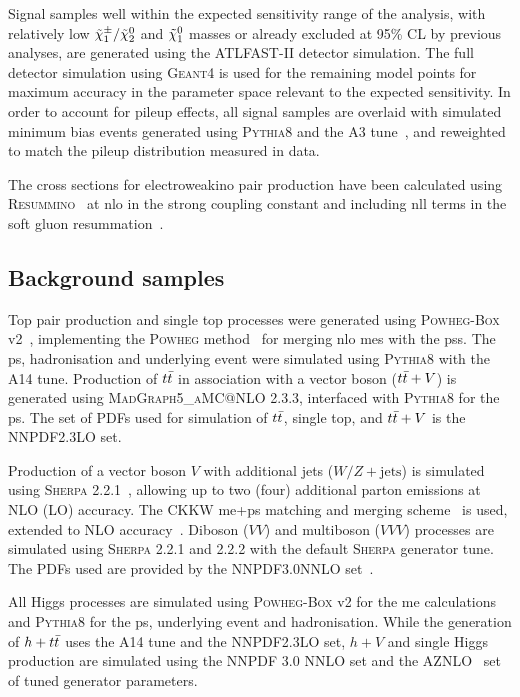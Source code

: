 Signal samples well within the expected sensitivity range of the analysis, \ie with relatively low $\tilde{\chi}_1^\pm/\tilde{\chi}_2^0$ and $\tilde{\chi}_1^0$ masses or already excluded at 95\% CL by previous analyses, are generated using the \textsc{ATLFAST-II} detector simulation. The full detector simulation using \textsc{Geant4} is used for the remaining model points for maximum accuracy in the parameter space relevant to the expected sensitivity. In order to account for pileup effects, all signal samples are overlaid with simulated minimum bias events generated using \textsc{Pythia8} and the A3 tune~\cite{ATL-PHYS-PUB-2016-017}, and reweighted to match the pileup distribution measured in data. 

The cross sections for electroweakino pair production have been calculated using \textsc{Resummino}~\cite{Fuks:2013vua} at \gls{nlo} in the strong coupling constant and including \gls{nll} terms in the soft gluon resummation~\cite{Fiaschi:2018hgm,Fuks:2012qx}.

\subsection{Background samples}

Top pair production and single top processes were generated using \textsc{Powheg-Box} v2~\cite{PowhegBox:2010xd}, implementing the \textsc{Powheg} method~\cite{Powheg1,Powheg2} for merging \gls{nlo} \glspl{me} with the \glspl{ps}. The \gls{ps}, hadronisation and underlying event were simulated using \textsc{Pythia8} with the A14 tune. Production of $t\bar{t}$ in association with a vector boson ($t\bar{t}+V$) is generated using \textsc{MadGraph5\_aMC@NLO} 2.3.3, interfaced with \textsc{Pythia8} for the \gls{ps}. The set of \glspl{PDF} used for simulation of $t\bar{t}$, single top, and $t\bar{t}+V$ is the NNPDF2.3LO set.

Production of a vector boson $V$ with additional jets ($W/Z+\mathrm{jets}$) is simulated using \textsc{Sherpa} 2.2.1~\cite{Gleisberg:2008ta,Bothmann:2019yzt}, allowing up to two (four) additional parton emissions at NLO (LO) accuracy. The CKKW \gls{me}+\gls{ps} matching and merging scheme~\cite{Hoeche:2009rj,Catani:2001cc} is used, extended to NLO accuracy~\cite{Hoeche:2012yf}. Diboson ($VV$) and multiboson ($VVV$) processes are simulated using \textsc{Sherpa} 2.2.1 and 2.2.2 with the default \textsc{Sherpa} generator tune. The \glspl{PDF} used are provided by the NNPDF3.0NNLO set~\cite{Ball:2014uwa}.

All Higgs processes are simulated using \textsc{Powheg-Box} v2 for the \gls{me} calculations and \textsc{Pythia8} for the \gls{ps}, underlying event and hadronisation. While the generation of $h+t\bar{t}$ uses the A14 tune and the NNPDF2.3LO set, $h+V$ and single Higgs production are simulated using the NNPDF 3.0 NNLO set and the AZNLO~\cite{ATL-PHYS-PUB-2013-017} set of tuned generator parameters.

